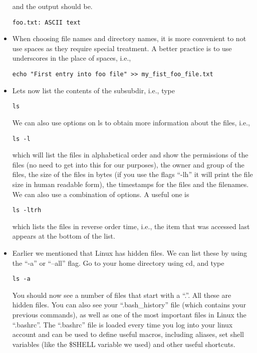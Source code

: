 \documentclass[aps,showpacs,prd,notitlepage,preprintnumbers,amsmath,amssymb,letterpaper]{revtex4}
\begin{document}
\begin{itemize}
and the output should be.
\begin{verbatim}
foo.txt: ASCII text
\end{verbatim}

\item When choosing file names and directory names, it is more
  convenient to not use spaces as they require special treatment. A
  better practice is to use underscores in the place of spaces, i.e.,

\begin{verbatim}
echo "First entry into foo file" >> my_fist_foo_file.txt
\end{verbatim}

\item Lets now list the contents of the subsubdir, i.e., type

\begin{verbatim}
ls 
\end{verbatim}

We can also use options on ls to obtain more information about the files, i.e.,

\begin{verbatim}
ls -l
\end{verbatim}

which will list the files in alphabetical order and show the permissions of the files (no need to get into this for our purposes), the owner and group of the files, the size of the files in bytes (if you use the flags ``-lh'' it will print the file size in human readable form), the timestamps for the files and the filenames. We can also use a combination of options. A useful one is

\begin{verbatim}
ls -ltrh
\end{verbatim}

which lists the files in reverse order time, i.e., the item that was
accessed last appears at the bottom of the list.

\item Earlier we mentioned that Linux has hidden files. We can list
  these by using the ``-a'' or ``--all'' flag. Go to your home
  directory using cd, and type

\begin{verbatim}
ls -a
\end{verbatim}

You should now see a number of files that start with a ``.''. All
these are hidden files. You can also see your ``.bash\_history'' file
(which contains your previous commands), as well as one of the most
important files in Linux the ``.bashrc''. The ``.bashrc'' file is
loaded every time you log into your linux account and can be used to
define useful macros, including aliases, set shell variables (like the
\$SHELL variable we used) and other useful shortcuts.

 

\end{itemize}
\end{document}
